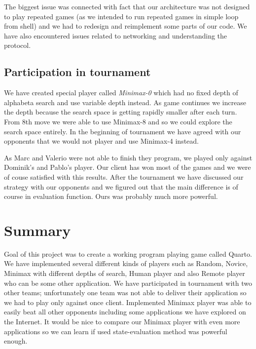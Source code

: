 \documentclass[paper=a4, fontsize=11pt]{article} %
\begin{document}
The biggest issue was connected with fact that our architecture was not designed to play repeated games (as we intended to run repeated games in simple loop from shell) and we had to redesign and reimplement some parts of our code. We have also encountered issues related to networking and understanding the protocol.

\subsection{Participation in tournament}
We have created special player called \emph{Minimax-0} which had no fixed depth of alphabeta search and use variable depth instead. As game continues we increase the depth because the search space is getting rapidly smaller after each turn. From 8th move we were able to use Minimax-8 and so we could explore the search space entirely. In the beginning of tournament we have agreed with our opponents that we would not player and use Minimax-4 instead.



As Marc and Valerio were not able to finish they program, we played only against Dominik's and Pablo's player. Our client has won most of the games and we were of couse satisfied with this results. After the tournament we have discussed our strategy with our opponents and we figured out that the main difference is of course in evaluation function. Ours was probably much more powerful.

\section{Summary}
Goal of this project was to create a working program playing game called Quarto.
We have implemented several different kinds of players such as Random, Novice, Minimax with different depths of search, Human player and also Remote player who can be some other application. 
We have participated in tournament with two other teams; unfortunately one team was not able to deliver their application so we had to play only against once client. 
Implemented Minimax player was able to easily beat all other opponents including some applications we have explored on the Internet. 
It would be nice to compare our Minimax player with even more applications so we can learn if used state-evaluation method was powerful enough.

\begin{flushleft}
%
\end{flushleft}
\end{document}
